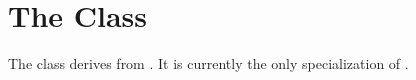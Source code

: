 

\section{The  Class}
\label{Integral}

The  class derives from .
It is currently the only specialization of .